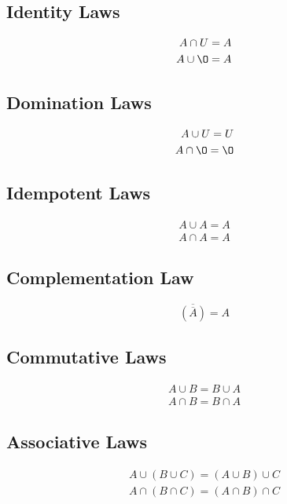 \documentclass[12pt letter]{report}
\begin{document}
\subsection{Identity Laws}

\begin{align*}
  A \cap   U = A \\
  A \cup  \O = A
\end{align*}

\subsection{Domination Laws}

\begin{align*}
  A \cup U = U \\
  A \cap \O = \O
\end{align*}

\subsection{Idempotent Laws}

\begin{align*}
  A \cup A = A \\
  A \cap A = A
\end{align*}

\subsection{Complementation Law}
\[
  \overline{\left( \overline{A} \right) } = A
\]

\subsection{Commutative Laws}

\begin{align*}
  A \cup B = B \cup A \\
  A \cap B = B \cap A
\end{align*}

\subsection{Associative Laws}

\begin{align*}
  A \cup \left( B \cup  C \right)  = \left( A \cup B \right)  \cup C \\
  A \cap \left( B \cap C  \right)  = \left( A \cap B \right)  \cap C
\end{align*}
\end{document}
